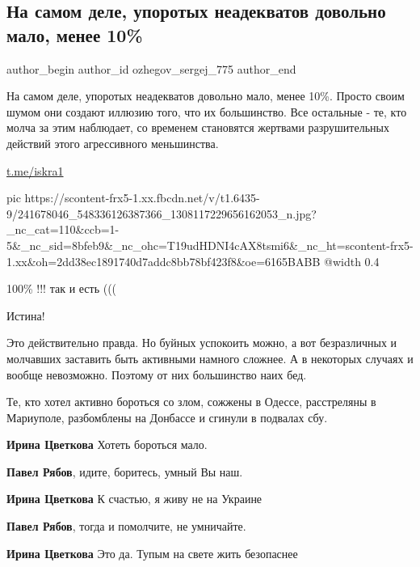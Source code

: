  
 
 
 
 
 
\subsection{На самом деле, упоротых неадекватов довольно мало, менее 10\%}
\label{sec:11_09_2021.fb.ozhegov_sergej_775.1.uporotyje}
 
\ifcmt
 author_begin
   author_id ozhegov_sergej_775
 author_end
\fi

На самом деле, упоротых неадекватов довольно мало, менее 10\%. Просто своим
шумом они создают иллюзию того, что их большинство.  Все остальные - те, кто
молча за этим наблюдает, со временем становятся жертвами разрушительных
действий этого агрессивного меньшинства.

\url{t.me/iskra1}

\ifcmt
  pic https://scontent-frx5-1.xx.fbcdn.net/v/t1.6435-9/241678046_548336126387366_1308117229656162053_n.jpg?_nc_cat=110&ccb=1-5&_nc_sid=8bfeb9&_nc_ohc=T19udHDNI4cAX8tsmi6&_nc_ht=scontent-frx5-1.xx&oh=2dd38ec1891740d7addc8bb78bf423f8&oe=6165BABB
  @width 0.4
\fi

\begin{itemize} %
100\% !!! так и есть (((

Истина!


Это действительно правда. Но буйных успокоить можно, а вот безразличных и
молчавших заставить быть активными намного сложнее. А в некоторых случаях и
вообще невозможно. Поэтому от них большинство наих бед.

Те, кто хотел активно бороться со злом, сожжены в Одессе, расстреляны в
Мариуполе, разбомблены на Донбассе и сгинули в подвалах сбу.

\begin{itemize} %
\textbf{Ирина Цветкова} Хотеть бороться мало.

\textbf{Павел Рябов}, идите, боритесь, умный Вы наш.


\textbf{Ирина Цветкова} К счастью, я живу не на Украине


\textbf{Павел Рябов}, тогда и помолчите, не умничайте.

\textbf{Ирина Цветкова} Это да. Тупым на свете жить безопаснее
\end{itemize} %

\end{itemize} %
